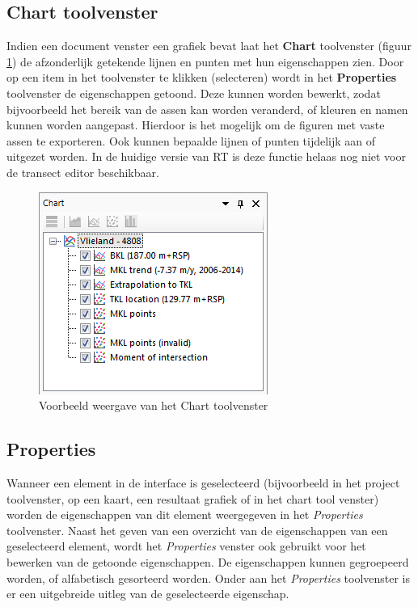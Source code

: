 \subsection{Chart toolvenster}
	\label{RT_Chart_Contents}
Indien een document venster een grafiek bevat laat het \textbf{Chart} toolvenster (figuur \ref{fig:3_Chart_Contents}) de afzonderlijk getekende lijnen en punten met hun eigenschappen zien. Door op een item in het toolvenster te klikken (selecteren) wordt in het \textbf{Properties} toolvenster de eigenschappen getoond. Deze kunnen worden bewerkt, zodat bijvoorbeeld het bereik van de assen kan worden veranderd, of kleuren en namen kunnen worden aangepast. Hierdoor is het mogelijk om de figuren met vaste assen te exporteren. Ook kunnen bepaalde lijnen of punten tijdelijk aan of uitgezet worden. In de huidige versie van RT is deze functie helaas nog niet voor de transect editor beschikbaar.

\begin{figure}[H]
	\centering
		\includegraphics{figures/chapter_general/Chart_Contents.png}
		\caption{Voorbeeld weergave van het Chart toolvenster}
	\label{fig:3_Chart_Contents}
\end{figure}

\subsection{Properties}
Wanneer een element in de interface is geselecteerd (bijvoorbeeld in het project toolvenster, op een kaart, een resultaat grafiek of in het chart tool venster) worden de eigenschappen van dit element weergegeven in het \textit{Properties} toolvenster. Naast het geven van een overzicht van de eigenschappen van een geselecteerd element, wordt het \textit{Properties} venster ook gebruikt voor het bewerken van de getoonde eigenschappen.
De eigenschappen kunnen gegroepeerd worden, of alfabetisch gesorteerd worden.
Onder aan het \textit{Properties} toolvenster is er een uitgebreide uitleg van de geselecteerde eigenschap.

